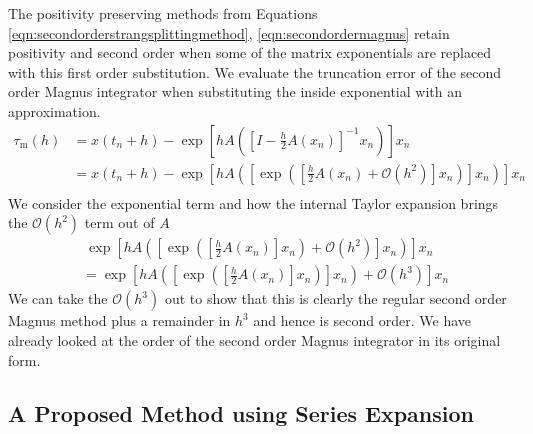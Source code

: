 The positivity preserving methods from Equations \ref{eqn:secondorderstrangsplittingmethod}, \ref{eqn:secondordermagnus} retain positivity and second order when some of the matrix exponentials are replaced with this first order substitution.
We evaluate the truncation error of the second order Magnus integrator when substituting the inside exponential with an approximation.
\begin{equation*}
    \begin{aligned}
        \tau_\mathrm{m}(h) &= x(t_n + h) - \exp \left[
            h A \left(
                \left[
                    I - \frac{h}{2}A(x_n)
                \right]^{-1} x_n
            \right)
        \right]x_n \\
        &= x(t_n + h) - \exp \left[
            h A \left(
                \left[
                    \exp \left(
                        \left[
                            \frac{h}{2}A(x_n) + \mathcal{O}(h^2)
                        \right] x_n
                    \right)
                \right] x_n
            \right)
        \right]x_n \\
    \end{aligned}
\end{equation*}
We consider the exponential term and how the internal Taylor expansion brings the $\mathcal{O}(h^2)$ term out of $A$
\begin{equation*}
    \begin{aligned}
        &~ \exp \left[
            h A \left(
                \left[
                    \exp \left(
                        \left[
                            \frac{h}{2}A(x_n)
                        \right] x_n
                    \right) + \mathcal{O}(h^2)
                \right] x_n
            \right)
        \right]x_n \\
        &= \exp \left[
            h A \left(
                \left[
                    \exp \left(
                        \left[
                            \frac{h}{2}A(x_n)
                        \right] x_n
                    \right)
                \right] x_n
            \right) + \mathcal{O}(h^3)
        \right]x_n
    \end{aligned}
\end{equation*}
We can take the $\mathcal{O}(h^3)$ out to show that this is clearly the regular second order Magnus method plus a remainder in $h^3$ and hence is second order.
We have already looked at the order of the second order Magnus integrator in its original form. 

\subsection{A Proposed Method using Series Expansion}

